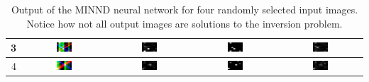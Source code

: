 \documentclass[twoside]{article}
\begin{document}
\begin{multicols}{2}
\begin{table}
\begin{tabular}{| r | c | c | c | c |}
3 & 
\includegraphics[width=0.2\textwidth]{images/8x8/3/in} &
\includegraphics[width=0.2\textwidth]{images/8x8/3/out} &
\includegraphics[width=0.2\textwidth]{images/8x8/3/truth} &
\includegraphics[width=0.2\textwidth]{images/8x8/3/dif} \\ \hline
4 & 
\includegraphics[width=0.2\textwidth]{images/8x8/4/in} &
\includegraphics[width=0.2\textwidth]{images/8x8/4/out} &
\includegraphics[width=0.2\textwidth]{images/8x8/4/truth} &
\includegraphics[width=0.2\textwidth]{images/8x8/4/dif} \\ \hline
\end{tabular}
\caption{Output of the MINND neural network for four randomly selected input images. Notice how not all output images are solutions to the inversion problem.}
\label{8x8im}
\end{table}


\end{multicols}
\end{document}
